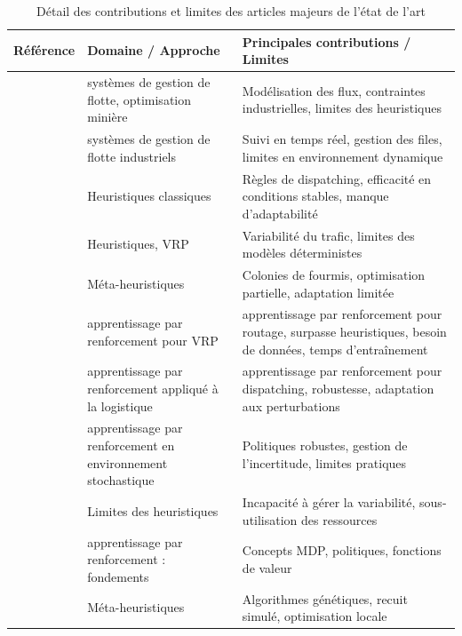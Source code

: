 \documentclass[11pt,a4paper]{report}
\begin{document}
\begin{table}[H]
\centering
\caption{Détail des contributions et limites des articles majeurs de l’état de l’art}
\label{tab:etat-art}
\begin{tabularx}{\textwidth}{>{\raggedright\arraybackslash}p{} >{\raggedright\arraybackslash}p{} >{\raggedright\arraybackslash}X}
\toprule
\textbf{Référence} & \textbf{Domaine / Approche} & \textbf{Principales contributions / Limites} \\
\midrule
\cite{AlexandraMNewman2010} & systèmes de gestion de flotte, optimisation minière & Modélisation des flux, contraintes industrielles, limites des heuristiques \\[4pt]
\cite{Afrapoli2017} & systèmes de gestion de flotte industriels & Suivi en temps réel, gestion des files, limites en environnement dynamique \\[4pt]
\cite{Alarie2002} & Heuristiques classiques & Règles de dispatching, efficacité en conditions stables, manque d’adaptabilité \\[4pt]
\cite{MarceloMorettiFioroni2008} & Heuristiques, VRP & Variabilité du trafic, limites des modèles déterministes \\[4pt]
\cite{BurakOzdemir2019} & Méta-heuristiques & Colonies de fourmis, optimisation partielle, adaptation limitée \\[4pt]
\cite{MohammadrezaNazari2018} & apprentissage par renforcement pour VRP & apprentissage par renforcement pour routage, surpasse heuristiques, besoin de données, temps d’entraînement \\[4pt]
\cite{WZeng2022, MiladAbolghasemian2020} & apprentissage par renforcement appliqué à la logistique & apprentissage par renforcement pour dispatching, robustesse, adaptation aux perturbations \\[4pt]
\cite{WZeng2022} & apprentissage par renforcement en environnement stochastique & Politiques robustes, gestion de l’incertitude, limites pratiques \\[4pt]
\cite{ShivPrakashUpadhyay2017} & Limites des heuristiques & Incapacité à gérer la variabilité, sous-utilisation des ressources \\[4pt]
\cite{CongZhang2020} & apprentissage par renforcement : fondements & Concepts MDP, politiques, fonctions de valeur \\[4pt]
\cite{Subtil2011, MJFSouza2010} & Méta-heuristiques & Algorithmes génétiques, recuit simulé, optimisation locale \\
\bottomrule
\end{tabularx}
\end{table}
\end{document}
